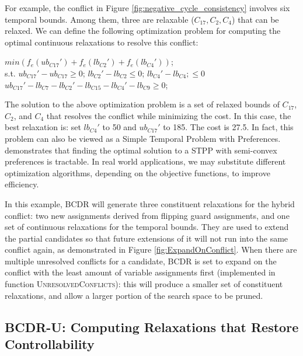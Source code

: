 \documentclass[jair,twoside,11pt,theapa]{article}
\begin{document}
For example, the conflict in Figure \ref{fig:negative_cycle_consistency}
involves six temporal bounds. Among them, three are relaxable
($C_{17},C_2,C_4$) that can be relaxed. We can define the following optimization
problem for computing the optimal continuous relaxations to resolve this
conflict:


\begin{center}
	$min(f_e(ub_{C17}')+f_e(lb_{C2}')+f_e(lb_{C4}'))$;\\
	s.t. $ub_{C17}'-ub_{C17}\geq 0$; $lb_{C2}'-lb_{C2}\leq 0$; $lb_{C4}'-lb_{C4};\leq 0$\\
	$ub_{C17}'-lb_{C7}-lb_{C2}'-lb_{C15}-lb_{C4}'-lb_{C9}\geq 0$;\\	
\end{center}

The solution to the above optimization problem is a set of relaxed bounds of
$C_{17}$, $C_2$, and $C_4$ that resolves the conflict while minimizing the cost.
In this case, the best relaxation is: set $lb_{C4}'$ to 50 and $ub_{C17}'$ to
185. The cost is 27.5. In fact, this problem can also be viewed as a Simple
Temporal Problem with Preferences. 
demonstrates that finding the optimal solution to a STPP with semi-convex
preferences is tractable. In real world applications, we may substitute
different optimization algorithms, depending on the objective functions, to
improve efficiency.


In this example, BCDR will generate three constituent relaxations for the hybrid
conflict: two new assignments derived from flipping guard assignments, and one
set of continuous relaxations for the temporal bounds. They are used to extend
the partial candidates so that future extensions of it will not run into the same
conflict again, as demonstrated in Figure \ref{fig:ExpandOnConflict}. When there are multiple unresolved conflicts for a candidate, BCDR is set to expand on the conflict with the least amount of variable assignments first (implemented in function \textsc{UnresolvedConflicts}): this will produce a smaller set of constituent relaxations, and allow a larger portion of the search space to be pruned.


\subsection{BCDR-U: Computing Relaxations that Restore Controllability}
\end{document}
